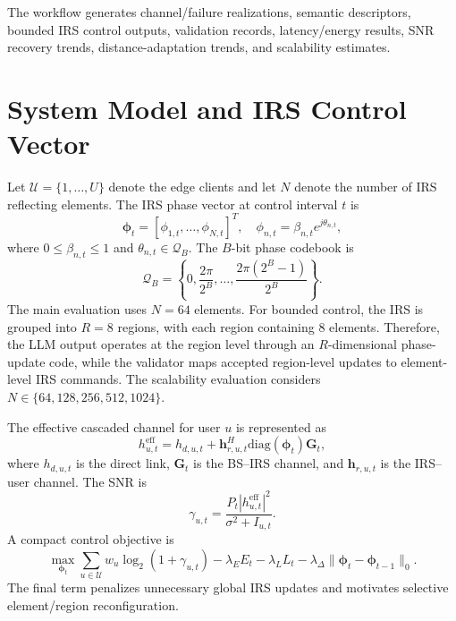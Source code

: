 \documentclass[11pt]{article}
\begin{document}
The workflow generates channel/failure realizations, semantic descriptors, bounded IRS control outputs, validation records, latency/energy results, SNR recovery trends, distance-adaptation trends, and scalability estimates.

\section{System Model and IRS Control Vector}

Let $\mathcal{U}=\{1,\ldots,U\}$ denote the edge clients and let $N$ denote the number of IRS reflecting elements. The IRS phase vector at control interval $t$ is
\begin{equation}
\boldsymbol{\phi}_{t}=[\phi_{1,t},\ldots,\phi_{N,t}]^{T},\quad
\phi_{n,t}=\beta_{n,t}e^{j\theta_{n,t}},
\end{equation}
where $0\leq\beta_{n,t}\leq1$ and $\theta_{n,t}\in\mathcal{Q}_{B}$. The $B$-bit phase codebook is
\begin{equation}
\mathcal{Q}_{B}=\left\{0,\frac{2\pi}{2^B},\ldots,\frac{2\pi(2^B-1)}{2^B}\right\}.
\end{equation}
The main evaluation uses $N=64$ elements. For bounded control, the IRS is grouped into $R=8$ regions, with each region containing $8$ elements. Therefore, the LLM output operates at the region level through an $R$-dimensional phase-update code, while the validator maps accepted region-level updates to element-level IRS commands. The scalability evaluation considers $N\in\{64,128,256,512,1024\}$.

The effective cascaded channel for user $u$ is represented as
\begin{equation}
h^{\mathrm{eff}}_{u,t}=h_{d,u,t}+\mathbf{h}^{H}_{r,u,t}\mathrm{diag}(\boldsymbol{\phi}_{t})\mathbf{G}_{t},
\end{equation}
where $h_{d,u,t}$ is the direct link, $\mathbf{G}_{t}$ is the BS--IRS channel, and $\mathbf{h}_{r,u,t}$ is the IRS--user channel. The SNR is
\begin{equation}
\gamma_{u,t}=\frac{P_t|h^{\mathrm{eff}}_{u,t}|^2}{\sigma^2+I_{u,t}}.
\end{equation}
A compact control objective is
\begin{equation}
\max_{\boldsymbol{\phi}_{t}}\sum_{u\in\mathcal{U}}w_u\log_2(1+\gamma_{u,t})-\lambda_EE_t-\lambda_LL_t-\lambda_{\Delta}\|\boldsymbol{\phi}_{t}-\boldsymbol{\phi}_{t-1}\|_0.
\end{equation}
The final term penalizes unnecessary global IRS updates and motivates selective element/region reconfiguration.
\end{document}
